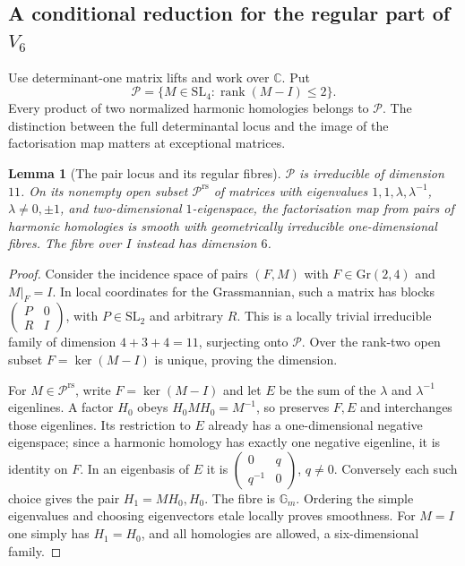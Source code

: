 \documentclass[11pt,a4paper]{article}
\theoremstyle{plain}
\newtheorem{lemma}[theorem]{Lemma}
\theoremstyle{definition}
\theoremstyle{remark}
\begin{document}
\subsection{A conditional reduction for the regular part of $V_6$}

Use determinant-one matrix lifts and work over $\mathbb C$. Put
\[
 \mathcal P=\{M\in\mathrm{SL}_4:\operatorname{rank}(M-I)\le2\}.
\]
Every product of two normalized harmonic homologies belongs to $\mathcal P$.
The distinction between the full determinantal locus and the image of the
factorisation map matters at exceptional matrices.

\begin{lemma}[The pair locus and its regular fibres]\label{lem:Pirr}
$\mathcal P$ is irreducible of dimension $11$. On its nonempty open subset
$\mathcal P^{\mathrm{rs}}$ of matrices with eigenvalues
$1,1,\lambda,\lambda^{-1}$, $\lambda\ne0,\pm1$, and two-dimensional
$1$-eigenspace, the factorisation map from pairs of harmonic homologies
is smooth with geometrically irreducible one-dimensional fibres.
The fibre over $I$ instead has dimension $6$.
\end{lemma}

\begin{proof}
Consider the incidence space of pairs $(F,M)$ with
$F\in\mathrm{Gr}(2,4)$ and $M|_F=I$. In local coordinates for the Grassmannian,
such a matrix has blocks $\left(\begin{smallmatrix}P&0\\R&I\end{smallmatrix}\right)$,
with $P\in\mathrm{SL}_2$ and arbitrary $R$. This is a locally trivial
irreducible family of dimension $4+3+4=11$, surjecting onto $\mathcal P$.
Over the rank-two open subset $F=\ker(M-I)$ is unique, proving the dimension.

For $M\in\mathcal P^{\mathrm{rs}}$, write $F=\ker(M-I)$ and let $E$ be
the sum of the $\lambda$ and $\lambda^{-1}$ eigenlines. A factor $H_0$ obeys
$H_0MH_0=M^{-1}$, so preserves $F,E$ and interchanges those eigenlines.
Its restriction to $E$ already has a one-dimensional negative eigenspace;
since a harmonic homology has exactly one negative eigenline, it is identity
on $F$. In an eigenbasis of $E$ it is
$\left(\begin{smallmatrix}0&q\\q^{-1}&0\end{smallmatrix}\right)$, $q\ne0$.
Conversely each such choice gives the pair $H_1=MH_0,H_0$.
The fibre is $\mathbb G_m$. Ordering the simple eigenvalues and choosing
eigenvectors etale locally proves smoothness. For $M=I$ one simply has
$H_1=H_0$, and all homologies are allowed, a six-dimensional family.
\end{proof}
\end{document}

